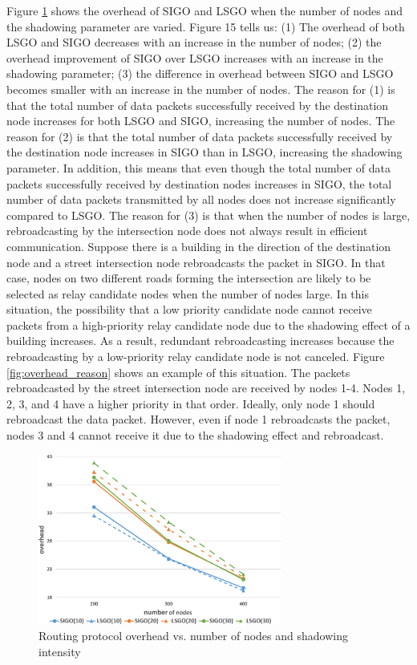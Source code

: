 \documentclass[conference]{IEEEtran}
\begin{document}


Figure \ref{fig:overhead} shows the overhead of SIGO and LSGO when the number of nodes and the shadowing parameter are varied. Figure 15 tells us: (1) The overhead of both LSGO and SIGO decreases with an increase in the number of nodes; (2) the overhead improvement of SIGO over LSGO increases with an increase in the shadowing parameter; (3) the difference in overhead between SIGO and LSGO becomes smaller with an increase in the number of nodes. The reason for (1) is that the total number of data packets successfully received by the destination node increases for both LSGO and SIGO, increasing the number of nodes. The reason for (2) is that the total number of data packets successfully received by the destination node increases in SIGO than in LSGO, increasing the shadowing parameter. In addition, this means that even though the total number of data packets successfully received by destination nodes increases in SIGO, the total number of data packets transmitted by all nodes does not increase signiﬁcantly compared to LSGO. The reason for (3) is that when the number of nodes is large, rebroadcasting by the intersection node does not always result in efficient communication. Suppose there is a building in the direction of the destination node and a street intersection node rebroadcasts the packet in SIGO. In that case, nodes on two different roads forming the intersection are likely to be selected as relay candidate nodes when the number of nodes large. In this situation, the possibility that a low priority candidate node cannot receive packets from a high-priority relay candidate node due to the shadowing effect of a building increases. As a result, redundant rebroadcasting increases because the rebroadcasting by a low-priority relay candidate node is not canceled. Figure \ref{fig:overhead_reason} shows an example of this situation. The packets rebroadcasted by the street intersection node are received by nodes 1-4. Nodes 1, 2, 3, and 4 have a higher priority in that order. Ideally, only node 1 should rebroadcast the data packet. However, even if node 1 rebroadcasts the packet, nodes 3 and 4 cannot receive it due to the shadowing effect and rebroadcast.






\begin{figure}[!ht]
\centering
\includegraphics[width=80mm]{figures/overhead.eps}
\caption{Routing protocol overhead vs. number of nodes and shadowing intensity }
\label{fig:overhead}
\end{figure}
\end{document}
